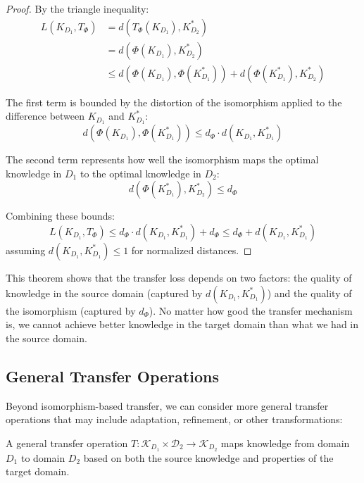 \begin{proof}
By the triangle inequality:
\begin{align}
L(K_{D_1}, T_{\Phi}) &= d(T_{\Phi}(K_{D_1}), K_{D_2}^*) \\
&= d(\Phi(K_{D_1}), K_{D_2}^*) \\
&\leq d(\Phi(K_{D_1}), \Phi(K_{D_1}^*)) + d(\Phi(K_{D_1}^*), K_{D_2}^*)
\end{align}

The first term is bounded by the distortion of the isomorphism applied to the difference between $K_{D_1}$ and $K_{D_1}^*$:
\begin{equation}
d(\Phi(K_{D_1}), \Phi(K_{D_1}^*)) \leq d_{\Phi} \cdot d(K_{D_1}, K_{D_1}^*)
\end{equation}

The second term represents how well the isomorphism maps the optimal knowledge in $D_1$ to the optimal knowledge in $D_2$:
\begin{equation}
d(\Phi(K_{D_1}^*), K_{D_2}^*) \leq d_{\Phi}
\end{equation}

Combining these bounds:
\begin{equation}
L(K_{D_1}, T_{\Phi}) \leq d_{\Phi} \cdot d(K_{D_1}, K_{D_1}^*) + d_{\Phi} \leq d_{\Phi} + d(K_{D_1}, K_{D_1}^*)
\end{equation}
assuming $d(K_{D_1}, K_{D_1}^*) \leq 1$ for normalized distances.
\end{proof}

This theorem shows that the transfer loss depends on two factors: the quality of knowledge in the source domain (captured by $d(K_{D_1}, K_{D_1}^*)$) and the quality of the isomorphism (captured by $d_{\Phi}$). No matter how good the transfer mechanism is, we cannot achieve better knowledge in the target domain than what we had in the source domain.

\subsection{General Transfer Operations}

Beyond isomorphism-based transfer, we can consider more general transfer operations that may include adaptation, refinement, or other transformations:

\begin{definition}
A general transfer operation $T: \mathcal{K}_{D_1} \times \mathcal{D}_2 \to \mathcal{K}_{D_2}$ maps knowledge from domain $D_1$ to domain $D_2$ based on both the source knowledge and properties of the target domain.
\end{definition}


